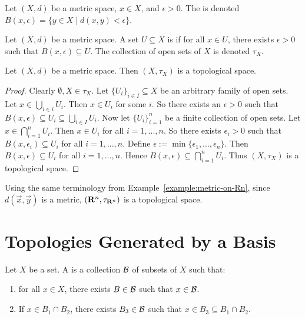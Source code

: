 \begin{definition}
    Let $(X,d)$ be a metric space, $x \in X$, and $\epsilon > 0$. The   is denoted $B(x,\epsilon) = \{y \in X \mid d(x,y) < \epsilon\}$.
\end{definition}

\begin{definition}
    Let $(X,d)$ be a metric space. A set $U \subseteq X$ is  if for all $x \in U$, there exists $\epsilon >0$ such that $B(x,\epsilon) \subseteq U$. The collection of open sets of $X$ is denoted $\tau_X$.
\end{definition}

\begin{proposition}
    Let $(X,d)$ be a metric space. Then $(X,\tau_X)$ is a topological space.
\end{proposition}
    \begin{proof}
        Clearly $\emptyset,X \in \tau_X$. Let $\{U_i\}_{i \in I} \subseteq X$ be an arbitrary family of open sets. Let $x \in \bigcup_{i \in i}U_i$. Then $x \in U_i$ for some $i$. So there exists an $\epsilon > 0$ such that $B(x,\epsilon) \subseteq U_i \subseteq \bigcup_{i \in I}U_i$. Now let $\{U_i\}_{i = 1}^n$ be a finite collection of open sets. Let $x \in \bigcap_{i = 1}^n U_i$. Then $x \in U_i$ for all $i = 1,...,n$. So there exists $\epsilon_i > 0$ such that $B(x,\epsilon_i) \subseteq U_i$ for all $i = 1,...,n$. Define $\epsilon := \min\{\epsilon_1,...,\epsilon_n\}$. Then $B(x,\epsilon) \subseteq U_i$ for all $i=1,...,n$. Hence $B(x,\epsilon) \subseteq \bigcap_{i = 1}^n U_i$. Thus $(X,\tau_X)$ is a topological space.
    \end{proof}

\begin{example}
    Using the same terminology from Example~\ref{example:metric-on-Rn}, since $d(\vec{x},\vec{y})$ is a metric, $(\mathbf{R}^n, \tau_{\mathbf{R}^n})$ is a topological space.
\end{example}

\section{Topologies Generated by a Basis}
\begin{definition}
    Let $X$ be a set. A  is a collection $\mathcal{B}$ of subsets of $X$ such that:
        \begin{enumerate}[label = (\arabic*),itemsep=1pt,topsep=3pt]
            \item for all $x \in X$, there exists $B \in \mathcal{B}$ such that $x \in \mathcal{B}$.
            \item If $x \in B_1 \cap B_2$, there exists $B_3 \in \mathcal{B}$ such that $x \in B_3 \subseteq B_1 \cap B_2$.
        \end{enumerate}
\end{definition}

